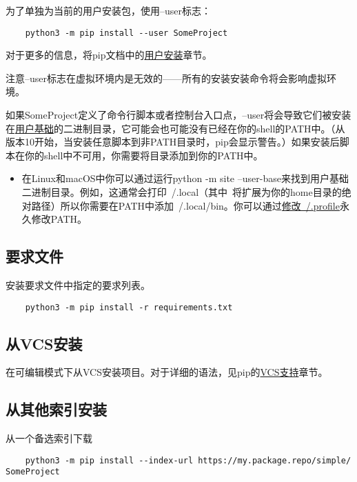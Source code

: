 \documentclass[../package_tutorial.tex]{subfiles}
\begin{document}
为了单独为当前的用户安装包，使用--user标志：

\begin{lstlisting}
    python3 -m pip install --user SomeProject
\end{lstlisting}

对于更多的信息，将pip文档中的\href{https://pip.readthedocs.io/en/latest/user_guide.html#user-installs}{用户安装}章节。

注意--user标志在虚拟环境内是无效的——所有的安装安装命令将会影响虚拟环境。

如果SomeProject定义了命令行脚本或者控制台入口点，--user将会导致它们被安装在\href{https://docs.python.org/3/library/site.html#site.USER_BASE}{用户基础}的二进制目录，它可能会也可能没有已经在你的shell的PATH中。（从版本10开始，当安装任意脚本到非PATH目录时，pip会显示警告。）如果安装后脚本在你的shell中不可用，你需要将目录添加到你的PATH中。

\begin{itemize}
    \item 在Linux和macOS中你可以通过运行python -m site --user-base来找到用户基础二进制目录。例如，这通常会打印~/.local（其中~将扩展为你的home目录的绝对路径）所以你需要在PATH中添加~/.local/bin。你可以通过\href{https://stackoverflow.com/a/14638025}{修改~/.profile}永久修改PATH。
\end{itemize}

\subsection{要求文件}

安装要求文件中指定的要求列表。

\begin{lstlisting}
    python3 -m pip install -r requirements.txt
\end{lstlisting}

\subsection{从VCS安装}

在可编辑模式下从VCS安装项目。对于详细的语法，见pip的\href{https://pip.pypa.io/en/latest/cli/pip_install/#vcs-support}{VCS支持}章节。

\subsection{从其他索引安装}

从一个备选索引下载

\begin{lstlisting}
    python3 -m pip install --index-url https://my.package.repo/simple/ SomeProject
\end{lstlisting}
\end{document}
